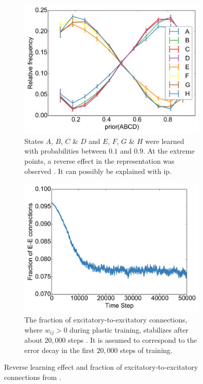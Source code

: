 \begin{figure}[!t]
    \centering
    \begin{subfigure}[t]{0.48\textwidth}
    	\centering
        \includegraphics[width=\textwidth]{discussion/reverse-effect}
        \caption{States $A$, $B$, $C$ \& $D$ and $E$, $F$, $G$ \& $H$  were learned with probabilities between $0.1$ and $0.9$. At the extreme points, a reverse effect in the representation was observed \parencite[figure 4c]{hartmann2015s}. It can possibly be explained with \acl{ip}.}
        \label{fig:reverse-effect}
    \end{subfigure}
    \hfill
    \begin{subfigure}[t]{0.48\textwidth}
    	\centering
        \includegraphics[width=\textwidth]{discussion/ex-to-ex}
        \caption{The fraction of excitatory-to-excitatory connections, where $w_{ij} > 0$ during plastic training, stabilizes after about $20,000$ steps \parencite[figure 1d]{hartmann2015s}. It is assumed to correspond to the error decay in the first $20,000$ steps of training.}
        \label{fig:ex-to-ex}
    \end{subfigure}
    \caption[Reverse learning effect and fraction of excitatory-to-excitatory connections]{Reverse learning effect and fraction of excitatory-to-excitatory connections from \textcite{hartmann2015s}.}
    \label{fig:hartmann-figs}
\end{figure}


